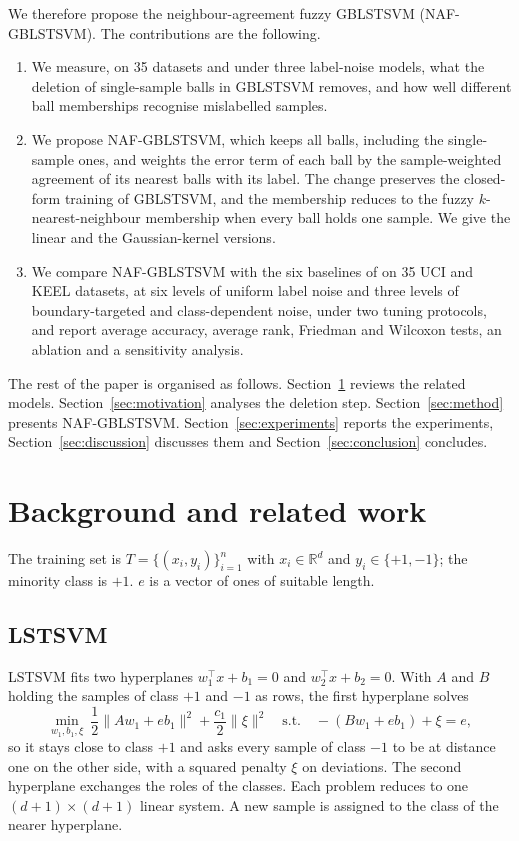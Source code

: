 \documentclass[preprint,12pt]{elsarticle}
\newcommand{\R}{\mathbb{R}}
\newcommand{\NAF}{NAF-GBLSTSVM}
\begin{document}
We therefore propose the neighbour-agreement fuzzy GBLSTSVM (\NAF{}). The contributions are the following.
\begin{enumerate}
\item We measure, on 35 datasets and under three label-noise models, what the deletion of single-sample balls in GBLSTSVM removes, and how well different ball memberships recognise mislabelled samples.
\item We propose \NAF{}, which keeps all balls, including the single-sample ones, and weights the error term of each ball by the sample-weighted agreement of its nearest balls with its label. The change preserves the closed-form training of GBLSTSVM, and the membership reduces to the fuzzy $k$-nearest-neighbour membership \cite{keller1985} when every ball holds one sample. We give the linear and the Gaussian-kernel versions.
\item We compare \NAF{} with the six baselines of \cite{tanveer2024gblstsvm} on 35 UCI and KEEL datasets, at six levels of uniform label noise and three levels of boundary-targeted and class-dependent noise, under two tuning protocols, and report average accuracy, average rank, Friedman and Wilcoxon tests, an ablation and a sensitivity analysis.
\end{enumerate}

The rest of the paper is organised as follows. Section~\ref{sec:related} reviews the related models. Section~\ref{sec:motivation} analyses the deletion step. Section~\ref{sec:method} presents \NAF{}. Section~\ref{sec:experiments} reports the experiments, Section~\ref{sec:discussion} discusses them and Section~\ref{sec:conclusion} concludes.

\section{Background and related work}
\label{sec:related}

The training set is $T=\{(x_i,y_i)\}_{i=1}^{n}$ with $x_i\in\R^{d}$ and $y_i\in\{+1,-1\}$; the minority class is $+1$. $e$ is a vector of ones of suitable length.

\subsection{LSTSVM}

LSTSVM \cite{kumar2009} fits two hyperplanes $w_1^{\top}x+b_1=0$ and $w_2^{\top}x+b_2=0$. With $A$ and $B$ holding the samples of class $+1$ and $-1$ as rows, the first hyperplane solves
\begin{equation}
\min_{w_1,b_1,\xi}\ \frac{1}{2}\lVert Aw_1+eb_1\rVert^{2}+\frac{c_1}{2}\lVert\xi\rVert^{2}
\quad\text{s.t.}\quad -(Bw_1+eb_1)+\xi=e ,
\label{eq:lstsvm}
\end{equation}
so it stays close to class $+1$ and asks every sample of class $-1$ to be at distance one on the other side, with a squared penalty $\xi$ on deviations. The second hyperplane exchanges the roles of the classes. Each problem reduces to one $(d+1)\times(d+1)$ linear system. A new sample is assigned to the class of the nearer hyperplane.
\end{document}
